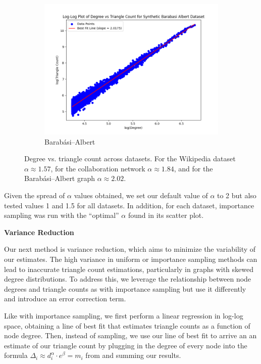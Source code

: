 \documentclass[11pt, margin=1in]{article}
\begin{document}
\begin{figure}[H]
    \hfill
    \begin{subfigure}[b]{0.495\textwidth}
        \centering
        \includegraphics[width=\textwidth]{plots/degree-vs-triangle-count/degree_vs_triangle_count_ba.png}
        \caption{Barabási–Albert}
        \label{fig:degree_vs_tri_ba}
    \end{subfigure}

    \caption{Degree vs. triangle count across datasets. For the Wikipedia dataset $\alpha \approx 1.57$, for the collaboration network $\alpha \approx 1.84$, and for the Barabási–Albert graph $\alpha \approx 2.02$.}
    \label{fig:degree_vs_tri_others}
\end{figure}

Given the spread of $\alpha$ values obtained, we set our default value of $\alpha$ to 2 but also tested values 1 and 1.5 for all datasets.
In addition, for each dataset, importance sampling was run with the ``optimal'' $\alpha$ found in its scatter plot.

\textbf{Variance Reduction}
\label{variance-reduction-algo}

Our next method is variance reduction, which aims to minimize the variability of our estimates.
The high variance in uniform or importance sampling methods can lead to inaccurate triangle count estimations, particularly in graphs with skewed degree distributions.
To address this, we leverage the relationship between node degrees and triangle counts as with importance sampling but use it differently and introduce an error correction term.

Like with importance sampling, we first perform a linear regression in log-log space, obtaining a line of best fit that estimates triangle counts as a function of node degree.
Then, instead of sampling, we use our line of best fit to arrive an an estimate of our triangle count by plugging in the degree of every node into the formula $\Delta_i \approx d_i^\alpha \cdot e^\beta = m_i$ from  and summing our results.
\end{document}
